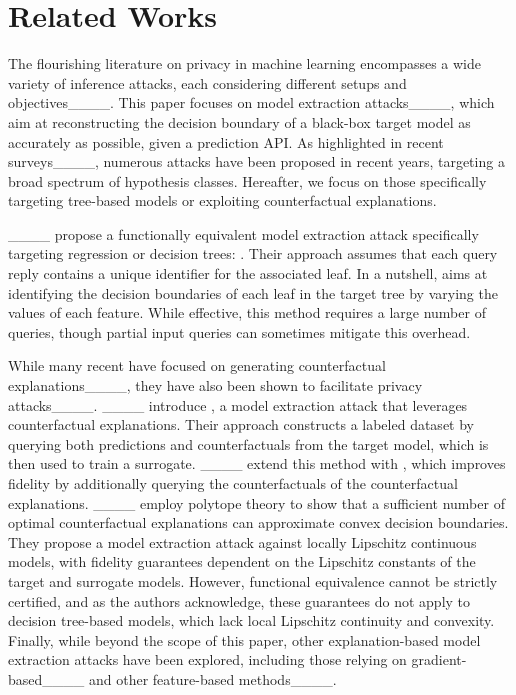 \section{Related Works}
The flourishing literature on privacy in machine learning encompasses a wide variety of inference attacks, each considering different setups and objectives____. 
This paper focuses on model extraction attacks____, which aim at reconstructing the decision boundary of a black-box target model as accurately as possible, given a prediction API. As highlighted in recent surveys____, numerous attacks have been proposed in recent years, targeting a broad spectrum of hypothesis classes. Hereafter, we focus on those specifically targeting tree-based models or exploiting counterfactual explanations. 

____ propose a functionally equivalent model extraction attack specifically targeting regression or decision trees: \PathFinding{}. Their approach assumes that each query reply contains a unique identifier for the associated leaf. In a nutshell, \PathFinding{} aims at identifying the decision boundaries of each leaf in the target tree by varying the values of each feature. While effective, this method requires a large number of queries, though partial input queries can sometimes mitigate this overhead.

While many recent have focused on generating counterfactual explanations____, they have also been shown to facilitate privacy attacks____. ____ introduce \CF{}, a model extraction attack that leverages counterfactual explanations. Their approach constructs a labeled dataset by querying both predictions and counterfactuals from the target model, which is then used to train a surrogate. ____ extend this method with \DualCF{}, which improves fidelity by additionally querying the counterfactuals of the counterfactual explanations.
____ employ polytope theory to show that a sufficient number of optimal counterfactual explanations can approximate convex decision boundaries. They propose a model extraction attack against locally Lipschitz continuous models, with fidelity guarantees dependent on the Lipschitz constants of the target and surrogate models. However, functional equivalence cannot be strictly certified, and as the authors acknowledge, these guarantees do not apply to decision tree-based models, which lack local Lipschitz continuity and convexity.
Finally, while beyond the scope of this paper, other explanation-based model extraction attacks have been explored, including those relying on gradient-based____ and other feature-based methods____.